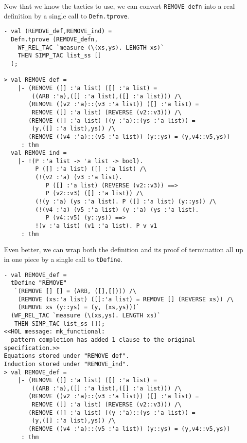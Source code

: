 Now that we know the tactics to use, we can convert 
{\tt REMOVE\_defn} into a real definition 
by a single call to {\tt Defn.tprove}.
\begin{session}
\begin{verbatim}
- val (REMOVE_def,REMOVE_ind) =
  Defn.tprove (REMOVE_defn,
    WF_REL_TAC `measure (\(xs,ys). LENGTH xs)`
    THEN SIMP_TAC list_ss []
  );

> val REMOVE_def =
    |- (REMOVE ([] :'a list) ([] :'a list) =
        ((ARB :'a),([] :'a list),([] :'a list))) /\
       (REMOVE ((v2 :'a)::(v3 :'a list)) ([] :'a list) =
        REMOVE ([] :'a list) (REVERSE (v2::v3))) /\
       (REMOVE ([] :'a list) ((y :'a)::(ys :'a list)) =
        (y,([] :'a list),ys)) /\
       (REMOVE ((v4 :'a)::(v5 :'a list)) (y::ys) = (y,v4::v5,ys))
     : thm
  val REMOVE_ind =
    |- !(P :'a list -> 'a list -> bool).
         P ([] :'a list) ([] :'a list) /\
         (!(v2 :'a) (v3 :'a list).
            P ([] :'a list) (REVERSE (v2::v3)) ==>
            P (v2::v3) ([] :'a list)) /\
         (!(y :'a) (ys :'a list). P ([] :'a list) (y::ys)) /\
         (!(v4 :'a) (v5 :'a list) (y :'a) (ys :'a list).
            P (v4::v5) (y::ys)) ==>
         !(v :'a list) (v1 :'a list). P v v1
     : thm
\end{verbatim}
\end{session}

Even better, we can wrap both the definition and
its proof of termination all up in one piece
by a single call to {\tt tDefine}.
\begin{session}
\begin{verbatim}
- val REMOVE_def =
  tDefine "REMOVE"
   `(REMOVE [] [] = (ARB, ([],[]))) /\
    (REMOVE (xs:'a list) ([]:'a list) = REMOVE [] (REVERSE xs)) /\
    (REMOVE xs (y::ys) = (y, (xs,ys)))`
  (WF_REL_TAC `measure (\(xs,ys). LENGTH xs)`
   THEN SIMP_TAC list_ss []);
<<HOL message: mk_functional: 
  pattern completion has added 1 clause to the original specification.>>
Equations stored under "REMOVE_def".
Induction stored under "REMOVE_ind".
> val REMOVE_def =
    |- (REMOVE ([] :'a list) ([] :'a list) =
        ((ARB :'a),([] :'a list),([] :'a list))) /\
       (REMOVE ((v2 :'a)::(v3 :'a list)) ([] :'a list) =
        REMOVE ([] :'a list) (REVERSE (v2::v3))) /\
       (REMOVE ([] :'a list) ((y :'a)::(ys :'a list)) =
        (y,([] :'a list),ys)) /\
       (REMOVE ((v4 :'a)::(v5 :'a list)) (y::ys) = (y,v4::v5,ys))
     : thm
\end{verbatim}
\end{session}

